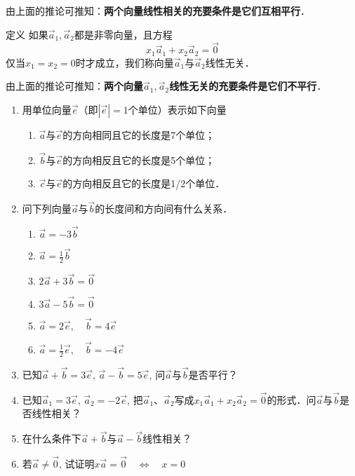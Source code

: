 由上面的推论可推知：\textbf{两个向量线性相关的充要条件是它们互相平行}．

\begin{blk}
    {定义} 如果$\vec{a}_1,\vec{a}_2$都是非零向量，且方程
    \[x_1\vec{a}_1+x_2\vec{a}_2=\vec{0}\]
仅当$x_1=x_2=0$时才成立，我们称向量$\vec{a}_1$与$\vec{a}_2$线性无关．
\end{blk}

由上面的推论可推知：\textbf{两个向量$\vec{a}_1,\vec{a}_2$线性无关的充要条件是它们不平行}．

\begin{ex}
\begin{enumerate}
    \item 用单位向量$\vec{e}$（即$|\vec{e}|=1$个单位）表示如下向量
\begin{enumerate}
    \item $\vec{a}$与$\vec{e}$的方向相同且它的长度是7个单位；
    \item $\vec{b}$与$\vec{e}$的方向相反且它的长度是5个单位；
    \item $\vec{c}$与$\vec{e}$的方向相反且它的长度是1/2个单位．
\end{enumerate} 
\item 问下列向量$\vec{a}$与$\vec{b}$的长度间和方向间有什么关系．
\begin{multicols}{2}
\begin{enumerate}
    \item $\vec{a}=-3\vec{b}$
    \item $\vec{a}=\frac{1}{2}\vec{b}$
    \item $2\vec{a}+3\vec{b}=\vec{0}$
    \item $3\vec{a}-5\vec{b}=\vec{0}$
    \item $\vec{a}=2\vec{e},\quad \vec{b}=4\vec{e}$
    \item $\vec{a}=\frac{1}{2}\vec{e},\quad \vec{b}=-4\vec{e}$
\end{enumerate}
\end{multicols}
\item 已知$\vec{a}+\vec{b}=3\vec{e}$, $\vec{a}-\vec{b}=5\vec{e}$, 问$\vec{a}$与$\vec{b}$是否平行？
\item 已知$\vec{a}_1=3\vec{e}$, $\vec{a}_2=-2\vec{e}$, 把$\vec{a}_1$、$\vec{a}_2$写成$x_1\vec{a}_1+x_2\vec{a}_2=\vec{0}$的形式．问$\vec{a}$与$\vec{b}$是否线性相关？
\item 在什么条件下$\vec{a}+\vec{b}$与$\vec{a}-\vec{b}$线性相关？
\item 若$\vec{a}\ne \vec{0}$, 试证明$x\vec{a}=\vec{0}\quad \Leftrightarrow\quad x=0$
\end{enumerate}  
\end{ex}

